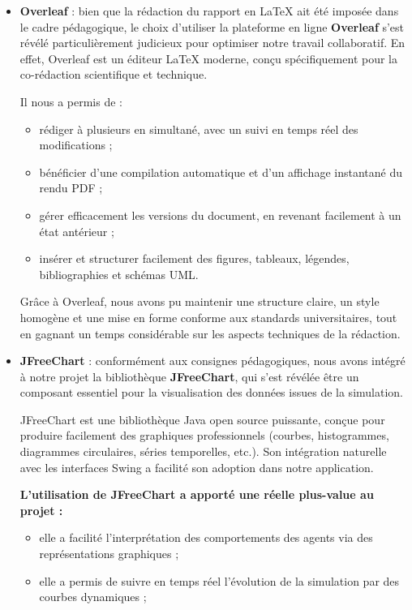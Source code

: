 \begin{itemize}
    \item \textbf{Overleaf} : bien que la rédaction du rapport en \LaTeX{} ait été imposée dans le cadre pédagogique, le choix d’utiliser la plateforme en ligne \textbf{Overleaf} s’est révélé particulièrement judicieux pour optimiser notre travail collaboratif. En effet, Overleaf est un éditeur \LaTeX{} moderne, conçu spécifiquement pour la co-rédaction scientifique et technique.

    Il nous a permis de :
    \begin{itemize}
        \item rédiger à plusieurs en simultané, avec un suivi en temps réel des modifications ;
        \item bénéficier d’une compilation automatique et d’un affichage instantané du rendu PDF ;
        \item gérer efficacement les versions du document, en revenant facilement à un état antérieur ;
        \item insérer et structurer facilement des figures, tableaux, légendes, bibliographies et schémas UML.
    \end{itemize}

    Grâce à Overleaf, nous avons pu maintenir une structure claire, un style homogène et une mise en forme conforme aux standards universitaires, tout en gagnant un temps considérable sur les aspects techniques de la rédaction.

    \item \textbf{JFreeChart} : conformément aux consignes pédagogiques, nous avons intégré à notre projet la bibliothèque \textbf{JFreeChart}, qui s’est révélée être un composant essentiel pour la visualisation des données issues de la simulation.

    JFreeChart est une bibliothèque Java open source puissante, conçue pour produire facilement des graphiques professionnels (courbes, histogrammes, diagrammes circulaires, séries temporelles, etc.). Son intégration naturelle avec les interfaces Swing a facilité son adoption dans notre application.

    \textbf{L'utilisation de JFreeChart a apporté une réelle plus-value au projet :}
    \begin{itemize}
         \item elle a facilité l’interprétation des comportements des agents via des représentations graphiques ;
        \item elle a permis de suivre en temps réel l’évolution de la simulation par des courbes dynamiques ;
       

\end{itemize}
\end{itemize}

